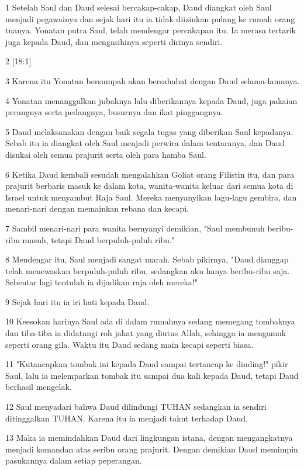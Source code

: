 \par 1 Setelah Saul dan Daud selesai bercakap-cakap, Daud diangkat oleh Saul menjadi pegawainya dan sejak hari itu ia tidak diizinkan pulang ke rumah orang tuanya. Yonatan putra Saul, telah mendengar percakapan itu. Ia merasa tertarik juga kepada Daud, dan mengasihinya seperti dirinya sendiri.
\par 2 [18:1]
\par 3 Karena itu Yonatan bersumpah akan bersahabat dengan Daud selama-lamanya.
\par 4 Yonatan menanggalkan jubahnya lalu diberikannya kepada Daud, juga pakaian perangnya serta pedangnya, busurnya dan ikat pinggangnya.
\par 5 Daud melaksanakan dengan baik segala tugas yang diberikan Saul kepadanya. Sebab itu ia diangkat oleh Saul menjadi perwira dalam tentaranya, dan Daud disukai oleh semua prajurit serta oleh para hamba Saul.
\par 6 Ketika Daud kembali sesudah mengalahkan Goliat orang Filistin itu, dan para prajurit berbaris masuk ke dalam kota, wanita-wanita keluar dari semua kota di Israel untuk menyambut Raja Saul. Mereka menyanyikan lagu-lagu gembira, dan menari-nari dengan memainkan rebana dan kecapi.
\par 7 Sambil menari-nari para wanita bernyanyi demikian, "Saul membunuh beribu-ribu musuh, tetapi Daud berpuluh-puluh ribu."
\par 8 Mendengar itu, Saul menjadi sangat marah. Sebab pikirnya, "Daud dianggap telah menewaskan berpuluh-puluh ribu, sedangkan aku hanya beribu-ribu saja. Sebentar lagi tentulah ia dijadikan raja oleh mereka!"
\par 9 Sejak hari itu ia iri hati kepada Daud.
\par 10 Keesokan harinya Saul ada di dalam rumahnya sedang memegang tombaknya dan tiba-tiba ia didatangi roh jahat yang diutus Allah, sehingga ia mengamuk seperti orang gila. Waktu itu Daud sedang main kecapi seperti biasa.
\par 11 "Kutancapkan tombak ini kepada Daud sampai tertancap ke dinding!" pikir Saul, lalu ia melemparkan tombak itu sampai dua kali kepada Daud, tetapi Daud berhasil mengelak.
\par 12 Saul menyadari bahwa Daud dilindungi TUHAN sedangkan ia sendiri ditinggalkan TUHAN. Karena itu ia menjadi takut terhadap Daud.
\par 13 Maka ia memindahkan Daud dari lingkungan istana, dengan mengangkatnya menjadi komandan atas seribu orang prajurit. Dengan demikian Daud memimpin pasukannya dalam setiap peperangan.
